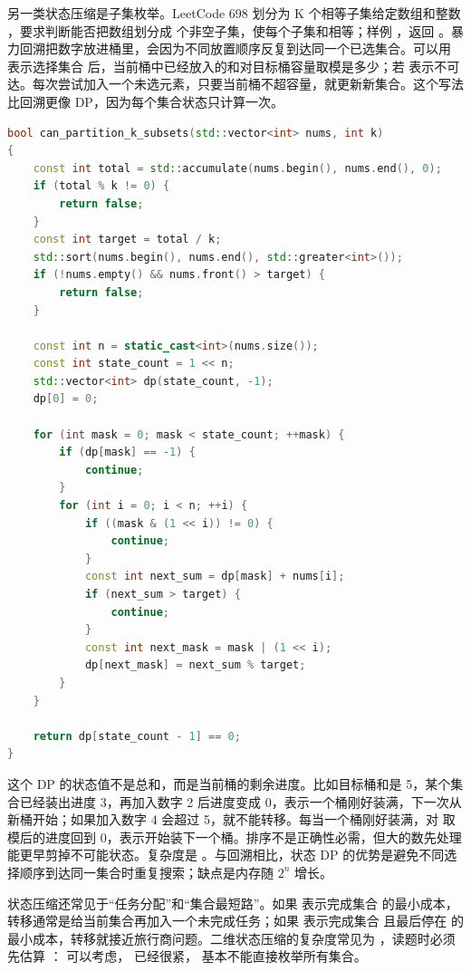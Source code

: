 另一类状态压缩是子集枚举。LeetCode 698 划分为 K 个相等子集给定数组和整数 ，要求判断能否把数组划分成  个非空子集，使每个子集和相等；样例 ，返回 。暴力回溯把数字放进桶里，会因为不同放置顺序反复到达同一个已选集合。可以用  表示选择集合  后，当前桶中已经放入的和对目标桶容量取模是多少；若  表示不可达。每次尝试加入一个未选元素，只要当前桶不超容量，就更新新集合。这个写法比回溯更像 DP，因为每个集合状态只计算一次。

\begin{lstlisting}[language=C++,caption={LeetCode 698 划分为 K 个等和子集：集合状态 DP}]
bool can_partition_k_subsets(std::vector<int> nums, int k)
{
    const int total = std::accumulate(nums.begin(), nums.end(), 0);
    if (total % k != 0) {
        return false;
    }
    const int target = total / k;
    std::sort(nums.begin(), nums.end(), std::greater<int>());
    if (!nums.empty() && nums.front() > target) {
        return false;
    }

    const int n = static_cast<int>(nums.size());
    const int state_count = 1 << n;
    std::vector<int> dp(state_count, -1);
    dp[0] = 0;

    for (int mask = 0; mask < state_count; ++mask) {
        if (dp[mask] == -1) {
            continue;
        }
        for (int i = 0; i < n; ++i) {
            if ((mask & (1 << i)) != 0) {
                continue;
            }
            const int next_sum = dp[mask] + nums[i];
            if (next_sum > target) {
                continue;
            }
            const int next_mask = mask | (1 << i);
            dp[next_mask] = next_sum % target;
        }
    }

    return dp[state_count - 1] == 0;
}
\end{lstlisting}

这个 DP 的状态值不是总和，而是当前桶的剩余进度。比如目标桶和是 5，某个集合已经装出进度 3，再加入数字 2 后进度变成 0，表示一个桶刚好装满，下一次从新桶开始；如果加入数字 4 会超过 5，就不能转移。每当一个桶刚好装满，对  取模后的进度回到 0，表示开始装下一个桶。排序不是正确性必需，但大的数先处理能更早剪掉不可能状态。复杂度是 。与回溯相比，状态 DP 的优势是避免不同选择顺序到达同一集合时重复搜索；缺点是内存随 \ensuremath{2^n} 增长。

状态压缩还常见于“任务分配”和“集合最短路”。如果  表示完成集合  的最小成本，转移通常是给当前集合再加入一个未完成任务；如果  表示完成集合  且最后停在  的最小成本，转移就接近旅行商问题。二维状态压缩的复杂度常见为 ，读题时必须先估算 ： 可以考虑， 已经很紧， 基本不能直接枚举所有集合。

